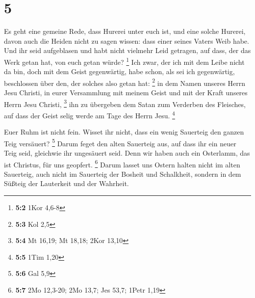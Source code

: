 \hypertarget{section-2}{%
\section{5}\label{section-2}}

 Es geht eine gemeine Rede, dass Hurerei unter euch ist, und
eine solche Hurerei, davon auch die Heiden nicht zu sagen wissen: dass
einer seines Vaters Weib habe.  Und ihr seid aufgeblasen und
habt nicht vielmehr Leid getragen, auf dass, der das Werk getan hat, von
euch getan würde? \footnote{\textbf{5:2} 1Kor 4,6-8}  Ich
zwar, der ich mit dem Leibe nicht da bin, doch mit dem Geist
gegenwärtig, habe schon, als sei ich gegenwärtig, beschlossen über den,
der solches also getan hat: \footnote{\textbf{5:3} Kol 2,5} 
in dem Namen unseres Herrn Jesu Christi, in eurer Versammlung mit meinem
Geist und mit der Kraft unseres Herrn Jesu Christi, \footnote{\textbf{5:4}
  Mt 16,19; Mt 18,18; 2Kor 13,10}  ihn zu übergeben dem
Satan zum Verderben des Fleisches, auf dass der Geist selig werde am
Tage des Herrn Jesu. \footnote{\textbf{5:5} 1Tim 1,20}

 Euer Ruhm ist nicht fein. Wisset ihr nicht, dass ein wenig
Sauerteig den ganzen Teig versäuert? \footnote{\textbf{5:6} Gal 5,9}
 Darum feget den alten Sauerteig aus, auf dass ihr ein neuer
Teig seid, gleichwie ihr ungesäuert seid. Denn wir haben auch ein
Osterlamm, das ist Christus, für uns geopfert. \footnote{\textbf{5:7}
  2Mo 12,3-20; 2Mo 13,7; Jes 53,7; 1Petr 1,19}  Darum lasset
uns Ostern halten nicht im alten Sauerteig, auch nicht im Sauerteig der
Bosheit und Schalkheit, sondern in dem Süßteig der Lauterkeit und der
Wahrheit.

